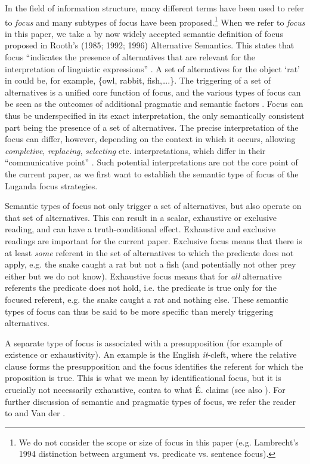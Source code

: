 \documentclass[output=paper]{langsci/langscibook}
\begin{document}
In the field of information structure, many different terms have been used to refer to \textit{focus} and many subtypes of focus have been proposed.\footnote{We do not consider the scope or size of focus in this paper (e.g. Lambrecht’s 1994 distinction between argument vs. predicate vs. sentence focus).}{} When we refer to \textit{focus} in this paper, we take a by now widely accepted semantic definition of focus proposed in Rooth’s (1985; 1992; 1996) Alternative Semantics. This states that focus “indicates the presence of alternatives that are relevant for the interpretation of linguistic expressions” \citep[6]{Krifka2007}. A set of alternatives for the object ‘rat’ in  could be, for example, \{owl, rabbit, fish,….\}. The triggering of a set of alternatives is a unified core function of focus, and the various types of focus can be seen as the outcomes of additional pragmatic and semantic factors \citep{ZimmermannOnea2011}. Focus can thus be underspecified in its exact interpretation, the only semantically consistent part being the presence of a set of alternatives. The precise interpretation of the focus can differ, however, depending on the context in which it occurs, allowing \textit{completive}, \textit{replacing}, \textit{selecting} etc. interpretations, which differ in their “communicative point” \citep[281]{Dik1997}. Such potential interpretations are not the core point of the current paper, as we first want to establish the semantic type of focus of the Luganda focus strategies. 

Semantic types of focus not only trigger a set of alternatives, but also operate on that set of alternatives. This can result in a scalar, exhaustive or exclusive reading, and can have a truth-conditional effect. Exhaustive and exclusive readings are important for the current paper. Exclusive focus means that there is at least \textit{some} referent in the set of alternatives to which the predicate does not apply, e.g. the snake caught a rat but not a fish (and potentially not other prey either but we do not know). Exhaustive focus means that for \textit{all} alternative referents the predicate does not hold, i.e. the predicate is true only for the focused referent, e.g. the snake caught a rat and nothing else. These semantic types of focus can thus be said to be more specific than merely triggering alternatives.

A separate type of focus is associated with a presupposition (for example of existence or exhaustivity). An example is the English \textit{it}-cleft, where the relative clause forms the presupposition and the focus identifies the referent for which the proposition is true. This is what we mean by identificational focus, but it is crucially not necessarily exhaustive, contra to what É. \citet{Kiss1998} claims (see also \citealt{OneaBeaver2011,ByramWashburn2013,DestruelEtAl2014}). For further discussion of semantic and pragmatic types of focus, we refer the reader to \citet{Bazalgette2015} and Van der \citet{Wal2016}.  
\end{document}
